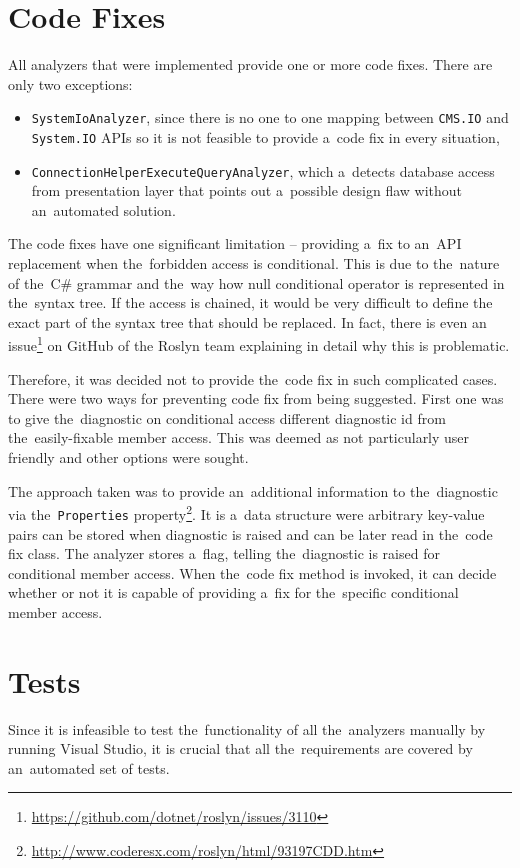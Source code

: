\documentclass[
  digital, %
  table,   %
  lof,     %
  lot,     %
  oneside,
]{fithesis3}
\begin{document}
\section{Code Fixes}
\label{sec:code-fixes}
All analyzers that were implemented provide one or more code fixes. There are only two exceptions:
\begin{itemize}
  \item \texttt{SystemIoAnalyzer}, since there is no one to one mapping between \texttt{CMS.IO} and \texttt{System.IO} APIs so it is not feasible to provide a~code fix in every situation,
  \item \texttt{ConnectionHelperExecuteQueryAnalyzer}, which a~detects database access from presentation layer that points out a~possible design flaw without an~automated solution.
\end{itemize} 

The code fixes have one significant limitation -- providing a~fix to an~API replacement when the~forbidden access is conditional. This is due to the~nature of the~C\# grammar and the~way how null conditional operator is represented in the~syntax tree. If the access is chained, it would be very difficult to define the exact part of the syntax tree that should be replaced. In fact, there is even an issue\footnote{\url{https://github.com/dotnet/roslyn/issues/3110}} on GitHub of the Roslyn team explaining in detail why this is problematic. 

Therefore, it was decided not to provide the~code fix in such complicated cases. There were two ways for preventing code fix from being suggested. First one was to give the~diagnostic on conditional access different diagnostic id from the~easily-fixable member access. This was deemed as not particularly user friendly and other options were sought.

The approach taken was to provide an~additional information to the~diagnostic via the~\texttt{Properties} property\footnote{\url{http://www.coderesx.com/roslyn/html/93197CDD.htm}}. It is a~data structure were arbitrary key-value pairs can be stored when diagnostic is raised and can be later read in the~code fix class. The analyzer stores a~flag, telling the~diagnostic is raised for conditional member access. When the~code fix method is invoked, it can decide whether or not it is capable of providing a~fix for the~specific conditional member access.

\section{Tests}
Since it is infeasible to test the~functionality of all the~analyzers manually by running Visual Studio, it is crucial that all the~requirements are covered by an~automated set of tests. 
\end{document}
